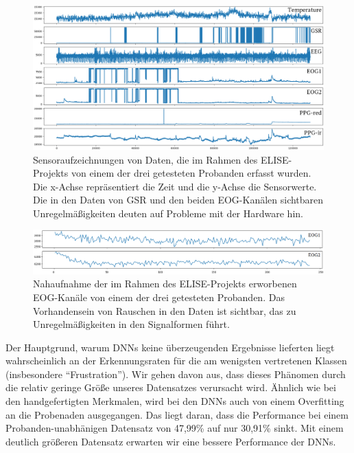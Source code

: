 \begin{figure}[H]
\includegraphics[width=\textwidth]{Images/bad_signals.png} 
\vspace{-0.3cm} \caption[Sensoraufzeichnungen von Daten]{ Sensoraufzeichnungen von Daten, die im Rahmen des ELISE-Projekts von einem der drei getesteten Probanden erfasst wurden. Die x-Achse repr{\"a}sentiert die Zeit und die y-Achse die Sensorwerte. Die in den Daten von GSR und den beiden EOG-Kan{\"a}len sichtbaren Unregelm{\"a}{\ss}igkeiten deuten auf Probleme mit der Hardware hin. }
\label{fig:bad_signals} \end{figure} \vspace{0.5cm}


\begin{figure}[H]
\includegraphics[width=\textwidth]{Images/zoom.png} 
\vspace{-0.3cm} \caption[Nahaufnahme von Rauschen in Daten]{ Nahaufnahme der im Rahmen des ELISE-Projekts erworbenen EOG-Kan{\"a}le von einem der drei getesteten Probanden. Das Vorhandensein von Rauschen in den Daten ist sichtbar, das zu Unregelm{\"a}{\ss}igkeiten in den Signalformen f{\"u}hrt. }
\label{fig:zoom} \end{figure} \vspace{0.5cm}




Der Hauptgrund, warum DNNs keine überzeugenden Ergebnisse lieferten liegt wahrscheinlich an der Erkennungsraten f{\"u}r die am wenigsten vertretenen Klassen (insbesondere ``Frustration'').
Wir gehen davon aus, dass dieses Ph{\"a}nomen durch die relativ geringe Gr{\"o}{\ss}e unseres Datensatzes verursacht wird. 
Ähnlich wie bei den handgefertigten Merkmalen, wird bei den DNNs auch von einem Overfitting an die Probenaden ausgegangen.
Das liegt daran, dass die Performance bei einem Probanden-unabhänigen Datensatz von 47,99\% auf nur 30,91\% sinkt.
Mit einem deutlich größeren Datensatz erwarten wir eine bessere Performance der DNNs.\\






